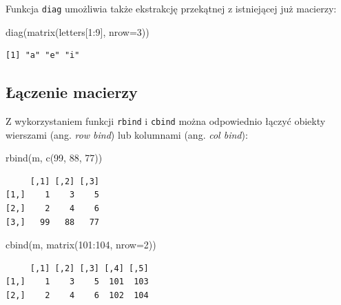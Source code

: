 \documentclass[
  letterpaper,
  DIV=11,
  numbers=noendperiod]{scrreprt}
\newenvironment{Shaded}{\begin{snugshade}}{\end{snugshade}}
\newcommand{\AttributeTok}[1]{\textcolor[rgb]{0.40,0.45,0.13}{#1}}
\newcommand{\DecValTok}[1]{\textcolor[rgb]{0.68,0.00,0.00}{#1}}
\newcommand{\FunctionTok}[1]{\textcolor[rgb]{0.28,0.35,0.67}{#1}}
\newcommand{\NormalTok}[1]{\textcolor[rgb]{0.00,0.23,0.31}{#1}}
\newcommand{\SpecialCharTok}[1]{\textcolor[rgb]{0.37,0.37,0.37}{#1}}
\begin{document}
Funkcja \texttt{diag} umożliwia także ekstrakcję przekątnej z
istniejącej już macierzy:

\begin{Shaded}
\begin{Highlighting}[]
\FunctionTok{diag}\NormalTok{(}\FunctionTok{matrix}\NormalTok{(letters[}\DecValTok{1}\SpecialCharTok{:}\DecValTok{9}\NormalTok{], }\AttributeTok{nrow=}\DecValTok{3}\NormalTok{))}
\end{Highlighting}
\end{Shaded}

\begin{verbatim}
[1] "a" "e" "i"
\end{verbatim}

\hypertarget{ux142ux105czenie-macierzy}{%
\subsection{Łączenie macierzy}\label{ux142ux105czenie-macierzy}}

Z wykorzystaniem funkcji \texttt{rbind} i \texttt{cbind} można
odpowiednio łączyć obiekty wierszami (ang. \emph{row bind}) lub
kolumnami (ang. \emph{col bind}):

\begin{Shaded}
\begin{Highlighting}[]
\FunctionTok{rbind}\NormalTok{(m, }\FunctionTok{c}\NormalTok{(}\DecValTok{99}\NormalTok{, }\DecValTok{88}\NormalTok{, }\DecValTok{77}\NormalTok{))}
\end{Highlighting}
\end{Shaded}

\begin{verbatim}
     [,1] [,2] [,3]
[1,]    1    3    5
[2,]    2    4    6
[3,]   99   88   77
\end{verbatim}

\begin{Shaded}
\begin{Highlighting}[]
\FunctionTok{cbind}\NormalTok{(m, }\FunctionTok{matrix}\NormalTok{(}\DecValTok{101}\SpecialCharTok{:}\DecValTok{104}\NormalTok{, }\AttributeTok{nrow=}\DecValTok{2}\NormalTok{))}
\end{Highlighting}
\end{Shaded}

\begin{verbatim}
     [,1] [,2] [,3] [,4] [,5]
[1,]    1    3    5  101  103
[2,]    2    4    6  102  104
\end{verbatim}
\end{document}
